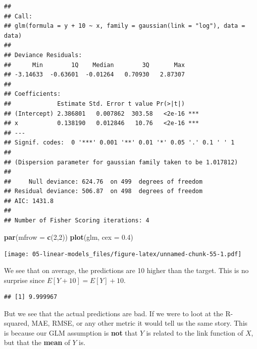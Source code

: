 \documentclass[openany]{book}
\newenvironment{Shaded}{\begin{snugshade}}{\end{snugshade}}
\newcommand{\DataTypeTok}[1]{\textcolor[rgb]{0.13,0.29,0.53}{#1}}
\newcommand{\DecValTok}[1]{\textcolor[rgb]{0.00,0.00,0.81}{#1}}
\newcommand{\FloatTok}[1]{\textcolor[rgb]{0.00,0.00,0.81}{#1}}
\newcommand{\KeywordTok}[1]{\textcolor[rgb]{0.13,0.29,0.53}{\textbf{#1}}}
\newcommand{\NormalTok}[1]{#1}
\newcommand{\OperatorTok}[1]{\textcolor[rgb]{0.81,0.36,0.00}{\textbf{#1}}}
\newcommand{\StringTok}[1]{\textcolor[rgb]{0.31,0.60,0.02}{#1}}
\begin{document}
\begin{verbatim}
## 
## Call:
## glm(formula = y + 10 ~ x, family = gaussian(link = "log"), data = data)
## 
## Deviance Residuals: 
##      Min        1Q    Median        3Q       Max  
## -3.14633  -0.63601  -0.01264   0.70930   2.87307  
## 
## Coefficients:
##             Estimate Std. Error t value Pr(>|t|)    
## (Intercept) 2.386801   0.007862  303.58   <2e-16 ***
## x           0.138190   0.012846   10.76   <2e-16 ***
## ---
## Signif. codes:  0 '***' 0.001 '**' 0.01 '*' 0.05 '.' 0.1 ' ' 1
## 
## (Dispersion parameter for gaussian family taken to be 1.017812)
## 
##     Null deviance: 624.76  on 499  degrees of freedom
## Residual deviance: 506.87  on 498  degrees of freedom
## AIC: 1431.8
## 
## Number of Fisher Scoring iterations: 4
\end{verbatim}

\begin{Shaded}
\begin{Highlighting}[]
\KeywordTok{par}\NormalTok{(}\DataTypeTok{mfrow =} \KeywordTok{c}\NormalTok{(}\DecValTok{2}\NormalTok{,}\DecValTok{2}\NormalTok{))}
\KeywordTok{plot}\NormalTok{(glm, }\DataTypeTok{cex =} \FloatTok{0.4}\NormalTok{)}
\end{Highlighting}
\end{Shaded}

\texttt{[image: 05-linear-models\_files/figure-latex/unnamed-chunk-55-1.pdf]}

We see that on average, the predictions are 10 higher than the target. This is no surprise since \(E[Y + 10] = E[Y] + 10\).

\begin{Shaded}
\end{Shaded}

\begin{verbatim}
## [1] 9.999967
\end{verbatim}

But we see that the actual predictions are bad. If we were to loot at the R-squared, MAE, RMSE, or any other metric it would tell us the same story. This is because our GLM assumption is \textbf{not} that \(Y\) is related to the link function of \(X\), but that the \textbf{mean} of \(Y\) is.
\end{document}
